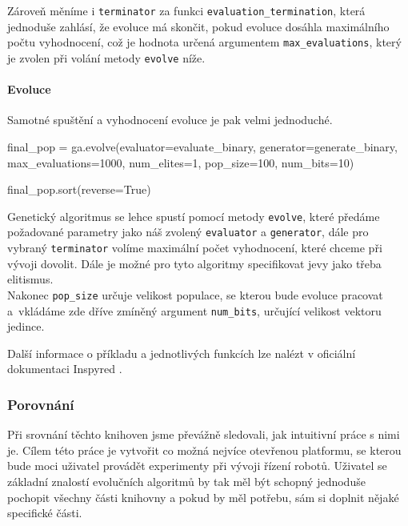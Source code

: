 Zároveň měníme i \texttt{terminator} za funkci \texttt{evaluation\_termination},
která jednoduše zahlásí, že evoluce má skončit, pokud evoluce dosáhla
maximálního počtu vyhodnocení, což je hodnota určená argumentem
\texttt{max\_evaluations}, který je zvolen při volání metody \texttt{evolve}
níže.

\paragraph{Evoluce}
Samotné spuštění a vyhodnocení evoluce je pak velmi jednoduché.

\begin{code}
final_pop = ga.evolve(evaluator=evaluate_binary,
                      generator=generate_binary,
                      max_evaluations=1000,
                      num_elites=1,
                      pop_size=100,
                      num_bits=10)

final_pop.sort(reverse=True)
\end{code}

Genetický algoritmus se lehce spustí pomocí metody \texttt{evolve}, které předáme
požadované parametry jako náš zvolený \texttt{evaluator} a \texttt{generator},
dále pro vybraný \texttt{terminator} volíme maximální počet vyhodnocení, které
chceme při vývoji dovolit. Dále je možné pro tyto algoritmy specifikovat jevy
jako třeba elitismus. \\Nakonec \texttt{pop\_size} určuje velikost populace, se
kterou bude evoluce pracovat a~vkládáme zde dříve zmíněný argument
\texttt{num\_bits}, určující velikost vektoru jedince. 

Další informace o příkladu a jednotlivých funkcích lze nalézt v oficiální
dokumentaci Inspyred \citep{InspyredDocs}.


\subsubsection{Porovnání} \label{GA - Porovnání}
Při srovnání těchto knihoven jsme převážně sledovali, jak intuitivní práce s
nimi je. Cílem této práce je vytvořit co možná nejvíce otevřenou platformu, se
kterou bude moci uživatel provádět experimenty při vývoji řízení robotů.
Uživatel se základní znalostí evolučních algoritmů by tak měl být schopný
jednoduše pochopit všechny části knihovny a pokud by měl potřebu, sám si
doplnit nějaké specifické části. 


